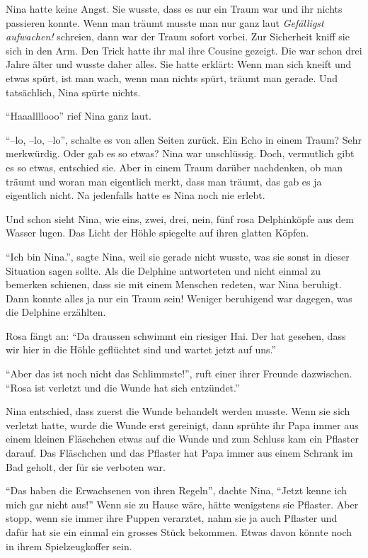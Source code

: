 Nina hatte keine Angst. Sie wusste, dass es nur ein Traum war und ihr nichts passieren konnte. Wenn man träumt musste man nur ganz laut {\it Gefälligst aufwachen!} schreien, dann war der Traum sofort vorbei. Zur Sicherheit kniff sie sich in den Arm. Den Trick hatte ihr mal ihre Cousine gezeigt. Die war schon drei Jahre älter und wusste daher alles. Sie hatte erklärt: Wenn man sich kneift und etwas spürt, ist man wach, wenn man nichts spürt, träumt man gerade. Und tatsächlich, Nina spürte nichts.

\enquote{Haaallllooo} rief Nina ganz laut.

\enquote{--lo, --lo, --lo}, schalte es von allen Seiten zurück. Ein Echo in einem Traum? Sehr merkwürdig. Oder gab es so etwas? Nina war unschlüssig. Doch, vermutlich gibt es so etwas, entschied sie. Aber in einem Traum darüber nachdenken, ob man träumt und woran man eigentlich merkt, dass man träumt, das gab es ja eigentlich nicht. Na jedenfalls hatte es Nina noch nie erlebt.

Und schon sieht Nina, wie eins, zwei, drei, nein, fünf rosa Delphinköpfe aus dem Wasser lugen. Das Licht der Höhle spiegelte auf ihren glatten Köpfen. 

\enquote{Ich bin Nina.}, sagte Nina, weil sie gerade nicht wusste, was sie sonst in dieser Situation sagen sollte. Als die Delphine antworteten und nicht einmal zu bemerken schienen, dass sie mit einem Menschen redeten, war Nina beruhigt. Dann konnte alles ja nur ein Traum sein! Weniger beruhigend war dagegen, was die Delphine erzählten.

Rosa fängt an: \enquote{Da draussen schwimmt ein riesiger Hai. Der hat gesehen, dass wir hier in die Höhle geflüchtet sind und wartet jetzt auf uns.}

\enquote{Aber das ist noch nicht das Schlimmste!}, ruft einer ihrer Freunde dazwischen. \enquote{Rosa ist verletzt und die Wunde hat sich entzündet.}

Nina entschied, dass zuerst die Wunde behandelt werden musste. Wenn sie sich verletzt hatte, wurde die Wunde erst gereinigt, dann sprühte ihr Papa immer aus einem kleinen Fläschchen etwas auf die Wunde und zum Schluss kam ein Pflaster darauf. Das Fläschchen und das Pflaster hat Papa immer aus einem Schrank im Bad geholt, der für sie verboten war. 

\enquote{Das haben die Erwachsenen von ihren Regeln}, dachte Nina, \enquote{Jetzt kenne ich mich gar nicht aus!} Wenn sie zu Hause wäre, hätte wenigstens sie Pflaster. Aber stopp, wenn sie immer ihre Puppen verarztet, nahm sie ja auch Pflaster und dafür hat sie ein einmal ein grosses Stück bekommen. Etwas davon könnte noch in ihrem Spielzeugkoffer sein.

